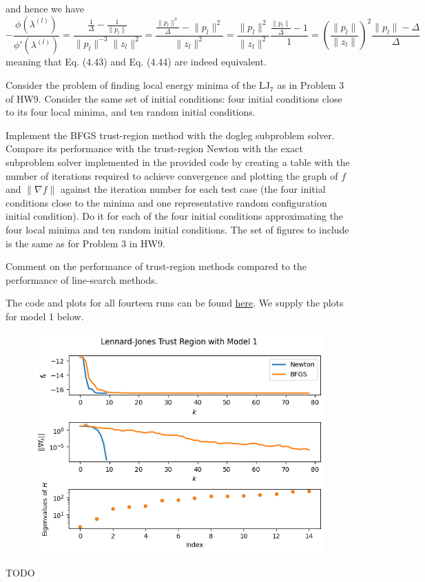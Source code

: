 \documentclass{../kin_math}
\begin{document}
\begin{questions}
\begin{solution}
    and hence we have
    \begin{equation*}
      -\frac{\phi(\lambda^{(l)})}{\phi'(\lambda^{(l)})} = \dfrac{\frac{1}{\Delta} - \frac{1}{\lVert p_l \rVert}}{\lVert p_l \rVert^{-3} \lVert z_l \rVert^2} = \dfrac{\frac{\lVert p_l \rVert^{3}}{\Delta} - \lVert p_l \rVert^2}{\lVert z_l \rVert^2} = \dfrac{\lVert p_l \rVert^2}{\lVert z_l \rVert^2} \dfrac{\frac{\lVert p_l \rVert}{\Delta} - 1}{1} = \left(\frac{\lVert p_l \rVert}{\lVert z_l \rVert}\right)^2 \frac{\lVert p_l \rVert - \Delta}{\Delta}
    \end{equation*}
    meaning that Eq. (4.43) and Eq. (4.44) are indeed equivalent.
  \end{solution}

  \question Consider the problem of finding local energy minima of the $\text{LJ}_7$ as in Problem 3 of HW9. Consider the same set of initial conditions: four initial conditions close to its four local minima, and ten random initial conditions.

  Implement the BFGS trust-region method with the dogleg subproblem solver. Compare its performance with the trust-region Newton with the exact subproblem solver implemented in the provided code by creating a table with the number of iterations required to achieve convergence and plotting the graph of $f$ and $\lVert \nabla f \rVert$ against the iteration number for each test case (the four initial conditions close to the minima and one representative random configuration initial condition). Do it for each of the four initial conditions approximating the four local minima and ten random initial conditions. The set of figures to include is the same as for Problem 3 in HW9.

  Comment on the performance of trust-region methods compared to the performance of line-search methods.
  \begin{solution}
    The code and plots for all fourteen runs can be found \href{https://github.com/elijahkin/amsc660/blob/main/hw11/hw11.ipynb}{here}. We supply the plots for model 1 below.
    \begin{figure}
      \centering
      \includegraphics[scale=0.6]{lennard_jones.png}
    \end{figure}
    TODO
  \end{solution}


\end{questions}
\end{document}
